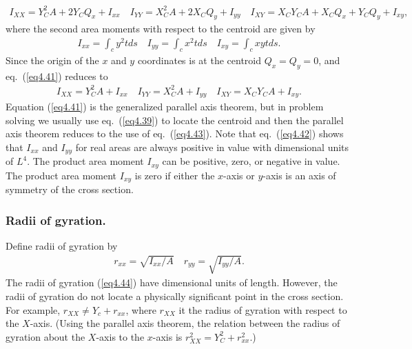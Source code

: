 \documentclass{AeroStructure-ERJohnson}
\begin{document}
\begin{align}\label{eq4.41}
I_{X X}=Y_{C}^{2} A+2 Y_{C} Q_{x}+I_{x x} \quad I_{Y Y}=X_{C}^{2} A+2 X_{C} Q_{y}+I_{y y} \quad I_{X Y}=X_{C} Y_{C} A+X_{C} Q_{x}+Y_{C} Q_{y}+I_{x y},
\end{align}
where the second area moments with respect to the centroid are given by
\begin{align}\label{eq4.42}
I_{x x}=\int_{c} y^{2} t d s \quad I_{y y}=\int_{c} x^{2} t d s \quad I_{x y}=\int_{c} x y t d s.
\end{align}
Since the origin of the $x$ and $y$ coordinates is at the centroid $Q_{x}=Q_{y}=0$, and eq.~(\ref{eq4.41}) reduces to
\begin{align}\label{eq4.43}
I_{X X}=Y_{C}^{2} A+I_{x x} \quad I_{Y Y}=X_{C}^{2} A+I_{y y} \quad I_{X Y}=X_{C} Y_{C} A+I_{x y}.
\end{align}
Equation (\ref{eq4.41}) is the generalized parallel axis theorem, but in problem solving we usually use eq.~(\ref{eq4.39}) to locate the centroid and then the parallel axis theorem reduces to the use of eq.~(\ref{eq4.43}). Note that eq.~(\ref{eq4.42}) shows that $I_{x x}$ and $I_{y y}$ for real areas are always positive in value with dimensional units of ${L^4}$. The product area moment $I_{x y}$ can be positive, zero, or negative in value. The product area moment $I_{x y}$ is zero if either the $x$-axis or $y$-axis is an axis of symmetry of the cross section.

\subsubsection{Radii of gyration.}  Define radii of gyration by
\begin{align}\label{eq4.44}
r_{x x}=\sqrt{I_{x x}/A} \quad r_{y y}=\sqrt{I_{y y}/A}.
\end{align}
The radii of gyration (\ref{eq4.44}) have dimensional units of length. However, the radii of gyration do not locate a physically significant point in the cross section. For example, $r_{X X} \neq Y_{c}+r_{xx}$, where $r_{X X}$ it the radius of gyration with respect to the $X$-axis. (Using the parallel axis theorem, the relation between the radius of gyration about the $X$-axis to the $x$-axis is $r_{X X}^{2}=Y_{C}^{2}+r_{x x}^{2}$.)
\end{document}
